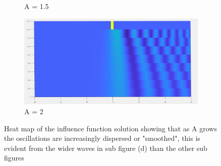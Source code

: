 \documentclass{article}
\begin{document}
\begin{figure}[H]
\begin{subfigure}[b]{85mm}
\caption{A = 1.5}
\label{fig:}
\end{subfigure}
\begin{subfigure}[b]{85mm}
\includegraphics[scale=0.14]{figures/infl2H.png}
\caption{A = 2}
\label{fig:}
\end{subfigure}

\caption{Heat map of the influence function solution showing that as A grows the oscillations are increasingly dispersed or "smoothed", this is evident from the wider waves in sub figure (d) than the other sub figures}
\label{fig:}
\end{figure}
\end{document}
